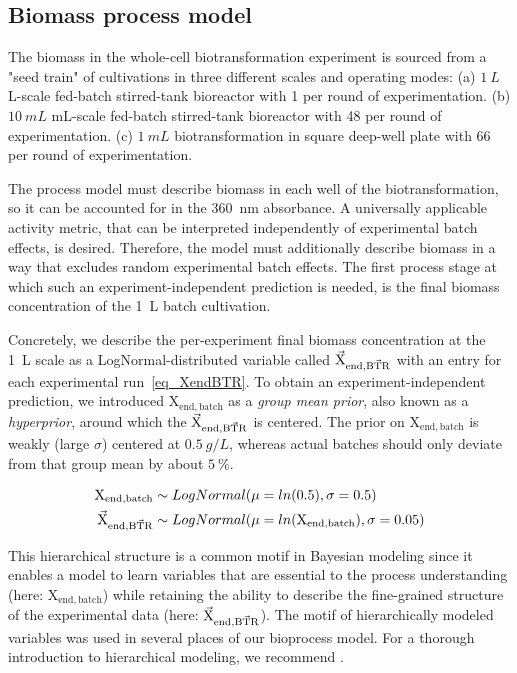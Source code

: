\documentclass[sn-standardnature]{sn-jnl}%
\def\vec{\mathaccent "017E\relax }
\theoremstyle{thmstyleone}%
\theoremstyle{thmstyletwo}%
\theoremstyle{thmstylethree}%
\begin{document}
\subsection{Biomass process model}
\label{sec_biomass_model}

The biomass in the whole-cell biotransformation experiment is sourced from a "seed train" of cultivations in three different scales and operating modes:
(a) $1\ L$ L-scale fed-batch stirred-tank bioreactor with 1 per round of experimentation.
(b) $10\ mL$ mL-scale fed-batch stirred-tank bioreactor with 48 per round of experimentation.
(c) $1\ mL$ biotransformation in square deep-well plate with 66 per round of experimentation.

The process model must describe biomass in each well of the biotransformation, so it can be accounted for in the 360~nm absorbance.
A universally applicable activity metric, that can be interpreted independently of experimental batch effects, is desired.
Therefore, the model must additionally describe biomass in a way that excludes random experimental batch effects.
The first process stage at which such an experiment-independent prediction is needed, is the final biomass concentration of the 1~L batch cultivation.

Concretely, we describe the per-experiment final biomass concentration at the 1~L scale as a LogNormal-distributed variable called $\mathrm{\vec{X}_{end,\vec{BTR}}}$ with an entry for each experimental run~\eqref{eq_XendBTR}.
To obtain an experiment-independent prediction, we introduced $\mathrm{X_{end,batch}}$ as a \textit{group mean prior}, also known as a \textit{hyperprior}, around which the $\mathrm{\vec{X}_{end,\vec{BTR}}}$ is centered.
The prior on $\mathrm{X_{end,batch}}$ is weakly (large $\sigma$) centered at $0.5\ g/L$, whereas actual batches should only deviate from that group mean by about $5\ \%$.

\begin{equation}
\begin{aligned}
    \mathrm{X_{end,batch}} &\sim LogNormal(\mu=ln(0.5), \sigma=0.5)\\
    \mathrm{\vec{X}_{end,\vec{BTR}}} &\sim LogNormal(\mu=ln(\mathrm{X_{end,batch}}), \sigma=0.05)
\end{aligned}
\label{eq_XendBTR}
\end{equation}

This hierarchical structure is a common motif in Bayesian modeling since it enables a model to learn variables that are essential to the process understanding (here: $\mathrm{X_{end,batch}}$) while retaining the ability to describe the fine-grained structure of the experimental data (here: $\mathrm{\vec{X}_{end,\vec{BTR}}}$).
The motif of hierarchically modeled variables was used in several places of our bioprocess model.
For a thorough introduction to hierarchical modeling, we recommend \cite{betancourt2020}.
\end{document}
